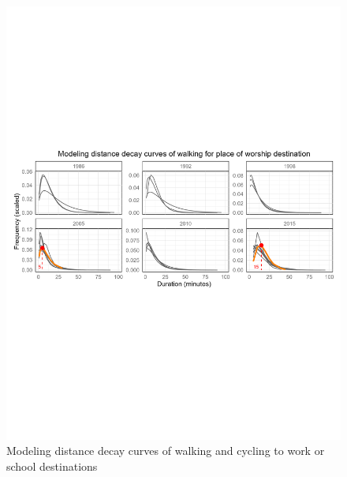 \documentclass[
11pt, %
oneside, %
english, %
singlespacing, %
]{macthesis} %
\begin{document}
\begin{figure}
\includegraphics[width=1\linewidth]{figure/ch03_fig_09} \caption{Modeling distance decay curves of walking and cycling to work or school destinations}\label{fig:ch03-plot-fig-09}
\end{figure}
\end{document}

